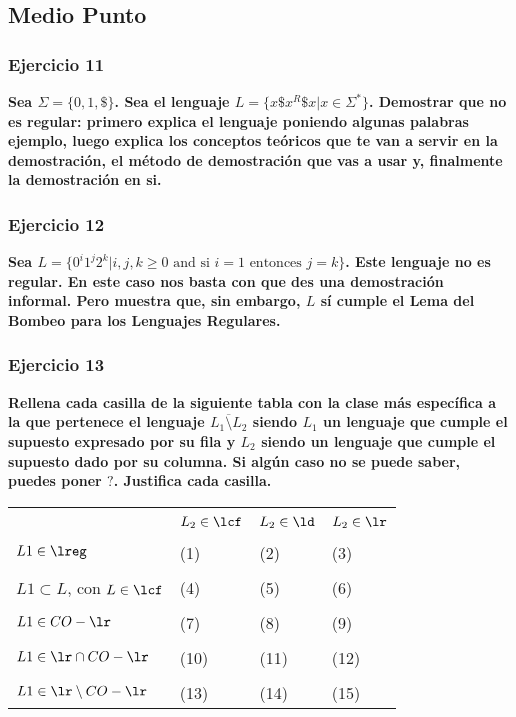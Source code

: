 \documentclass{article}
\begin{document}
\subsection{Medio Punto} 
\label{sec:mediopunto}
\subsubsection*{Ejercicio 11}

\textbf{Sea $\Sigma=\{0,1,\$\}$. Sea el lenguaje $L=\{x\$x^R\$x | x \in \Sigma^*\}$. Demostrar que no es regular: primero explica el lenguaje poniendo algunas palabras ejemplo, luego explica los conceptos teóricos que te van a servir en la demostración, el método de demostración que vas a usar y, finalmente la demostración en si.}


\subsubsection*{Ejercicio 12} \textbf{Sea $L= \{ 0^i 1^j 2^k |i,j,k \geq0 \mbox{ and si } i=1 \mbox{ entonces } j=k \} $. Este lenguaje no es regular. En este caso nos basta con que des una  demostración informal. Pero muestra que, sin embargo,  $L$ sí cumple el Lema del Bombeo para los Lenguajes Regulares.
}

\subsubsection*{Ejercicio 13}\textbf{Rellena cada casilla de la siguiente tabla con la clase \textbf{más específica} a la que pertenece el lenguaje  $\overline{L_1 \setminus L_2}$ siendo $L_1$ un lenguaje que cumple el supuesto expresado por su fila y $L_2$ siendo un lenguaje que cumple el supuesto dado por su columna. Si algún caso no se puede saber, puedes poner   $?$. \textbf{Justifica cada casilla.}}\\
 
\begin{table}[h]
 \begin{tabular}{|l|l|l|l|}
 \hline
 &&&\\
 &$L_2 \in \lcf$ &$ L_2 \in \ld$ & $ L_2 \in \lr$\\
 \hline
 &&&\\
  $ L1 \in \lreg$&(1)&(2)&(3)\\
  \hline
 &&&\\
 $ L1 \subset L$, con $L \in \lcf$&(4)&(5)&(6)\\
  \hline
 &&&\\
 $L1 \in CO-\lr $&(7)&(8)&(9)\\
  \hline
 &&&\\
 $L1 \in \lr \cap CO-\lr$&(10)&(11)&(12)\\
  \hline
 &&&\\
 $ L1 \in \lr \setminus CO-\lr$&(13)&(14)&(15)\\
  \hline
 \end{tabular}
 
\end{table}
\end{document}

